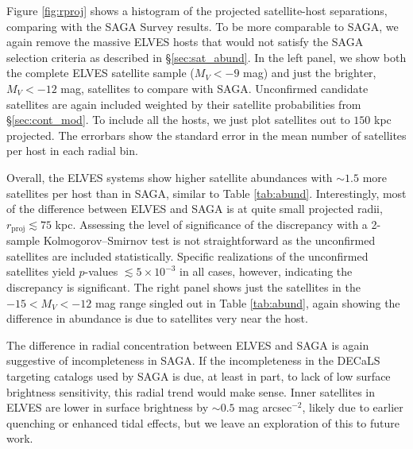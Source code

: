 \documentclass[twocolumn]{aastex62}
\begin{document}
Figure \ref{fig:rproj} shows a histogram of the projected satellite-host separations, comparing with the SAGA Survey results. To be more comparable to SAGA, we again remove the massive ELVES hosts that would not satisfy the SAGA selection criteria as described in \S\ref{sec:sat_abund}. In the left panel, we show both the complete ELVES satellite sample ($M_V<-9$ mag) and just the brighter, $M_V<-12$ mag, satellites to compare with SAGA. Unconfirmed candidate satellites are again included weighted by their satellite probabilities from \S\ref{sec:cont_mod}. To include all the hosts, we just plot satellites out to $150$ kpc projected. The errorbars show the standard error in the mean number of satellites per host in each radial bin. 

Overall, the ELVES systems show higher satellite abundances with $\sim1.5$ more satellites per host than in SAGA, similar to Table \ref{tab:abund}. Interestingly, most of the difference between ELVES and SAGA is at quite small projected radii, $r_\mathrm{proj}\lesssim75$ kpc.  Assessing the level of significance of the discrepancy with a 2-sample Kolmogorov–Smirnov test is not straightforward as the unconfirmed satellites are included statistically. Specific realizations of the unconfirmed satellites yield $p$-values $\lesssim 5\times 10^{-3}$ in all cases, however, indicating the discrepancy is significant. The right panel shows just the satellites in the $-15<M_V<-12$ mag range singled out in Table \ref{tab:abund}, again showing the difference in abundance is due to satellites very near the host. 


The difference in radial concentration between ELVES and SAGA is again suggestive of incompleteness in SAGA. If the incompleteness in the DECaLS targeting catalogs used by SAGA is due, at least in part, to lack of low surface brightness sensitivity, this radial trend would make sense. Inner satellites in ELVES are lower in surface brightness by $\sim0.5$ mag arcsec$^{-2}$, likely due to earlier quenching or enhanced tidal effects, but we leave an exploration of this to future work.  
\end{document}
